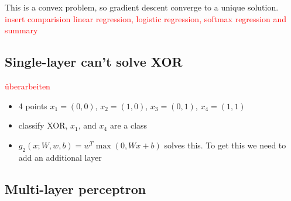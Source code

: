 \documentclass[10pt,a4paper]{article}
\begin{document}
This is a convex problem, so gradient descent converge to a unique solution.
\textcolor{red}{insert comparision linear regression, logistic regression, softmax regression and summary}

\subsection{Single-layer can't solve XOR}
\textcolor{red}{überarbeiten}

\begin{itemize}
\item 4 points $x_1=(0,0)$, $x_2=(1,0)$, $x_3=(0,1)$, $x_4=(1,1)$
\item classify XOR, $x_1$, and $x_4$ are a class
\item $g_2(x; W, w, b) = w^T \max(0, Wx +b)$ solves this. To get this we need to add an additional layer
\end{itemize}

\subsection{Multi-layer perceptron}
\end{document}
